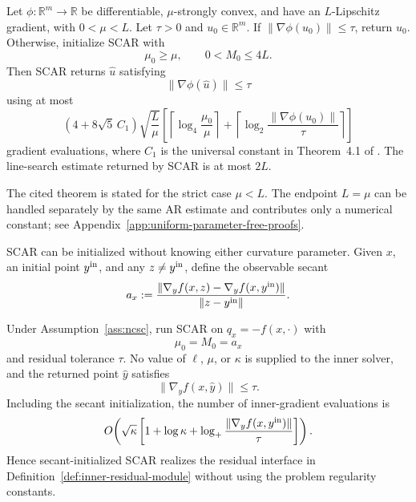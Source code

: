 \begin{theorem}
\label{thm:scar-blackbox}
Let $\phi:\mathbb{R}^m\to\mathbb{R}$ be differentiable,
$\mu$-strongly convex, and have an $L$-Lipschitz gradient, with
$0<\mu<L$. Let $\tau>0$ and $u_0\in\mathbb{R}^m$.
If $\|\nabla\phi(u_0)\|\le\tau$, return $u_0$.
Otherwise, initialize SCAR with
\[
    \mu_0\ge\mu,
    \qquad
    0<M_0\le4L.
\]
Then SCAR returns $\widehat u$ satisfying
\begin{equation}
    \|\nabla\phi(\widehat u)\|\le\tau
    \label{eq:scar-residual}
\end{equation}
using at most
\begin{equation}
    (4+8\sqrt5\,C_1)
    \sqrt{\frac{L}{\mu}}
    \left[
        \left\lceil
            \log_4\frac{\mu_0}{\mu}
        \right\rceil
        +
        \left\lceil
            \log_2
            \frac{\|\nabla\phi(u_0)\|}{\tau}
        \right\rceil
    \right]
    \label{eq:scar-original-complexity}
\end{equation}
gradient evaluations, where $C_1$ is the universal constant in
Theorem~4.1 of \citet{lan2026optimal}. The line-search estimate
returned by SCAR is at most $2L$.
\end{theorem}

The cited theorem is stated for the strict case $\mu<L$.
The endpoint $L=\mu$ can be handled separately by the same AR
estimate and contributes only a numerical constant; see
Appendix~\ref{app:uniform-parameter-free-proofs}.

SCAR can be initialized without knowing either curvature parameter.
Given $x$, an initial point $y^{\rm in}$, and any
$z\ne y^{\rm in}$, define the observable secant
\begin{equation}
    a_x
    :=
    \frac{
        \|\nabla_yf(x,z)-\nabla_yf(x,y^{\rm in})\|
    }{
        \|z-y^{\rm in}\|
    }.
    \label{eq:scar-secant}
\end{equation}

\begin{corollary}
\label{cor:scar-inner}
Under Assumption~\ref{ass:ncsc}, run SCAR on
$q_x=-f(x,\cdot)$ with
\[
    \mu_0=M_0=a_x
\]
and residual tolerance $\tau$.
No value of $\ell$, $\mu$, or $\kappa$ is supplied to the inner
solver, and the returned point $\widehat y$ satisfies
\[
    \|\nabla_yf(x,\widehat y)\|\le\tau.
\]
Including the secant initialization, the number of inner-gradient
evaluations is
\begin{equation}
    O\!\left(
        \sqrt\kappa
        \left[
            1+\log\kappa
            +
            \log_+
            \frac{
                \|\nabla_yf(x,y^{\rm in})\|
            }{
                \tau
            }
        \right]
    \right).
    \label{eq:scar-inner-complexity}
\end{equation}
Hence secant-initialized SCAR realizes the residual interface in
Definition~\ref{def:inner-residual-module} without using the problem
regularity constants.
\end{corollary}

